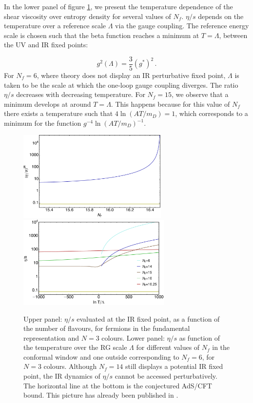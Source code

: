 In the lower panel of figure \ref{etas_Nf}, we present the temperature dependence of the shear viscosity over entropy 
density for several values of $N_f$. $\eta/s$ depends on the temperature over a reference scale $\Lambda$ via the 
gauge coupling. The reference energy scale is chosen such that the beta function reaches a minimum at $T=\Lambda$,
between the UV and IR fixed points:

\begin{equation}
g^2(\Lambda)=\frac{3}{5}(g^*)^2 \, .
\label{Lambda_visc}
\end{equation} 
%
For $N_f = 6$, where theory does not display an IR perturbative fixed point, $\Lambda$ is taken to be the scale at 
which the one-loop gauge coupling diverges. The ratio $\eta/s$ decreases with decreasing temperature. For $N_f=15$, we observe that a minimum develops at around $T = \Lambda$.  This happens  because for this value of $N_f$ there exists a temperature such that $4 \ln \left(AT/m_D \right)  = 1 $, which corresponds to a minimum for the function $g^{-4} \ln \left(AT/m_D \right)  ^{-1} $. 

\begin{figure}[h!]
\begin{center}
\includegraphics[width=0.665\textwidth]{pics/eta-s-n3} \\
\includegraphics[width=0.68\textwidth]{pics/Temperature-etaovers-n3}
\end{center}
\caption{Upper panel: ${\eta}/{s}$ evaluated at the IR fixed point, as a function of the number of flavours, for fermions in 
the fundamental representation and $N = 3$ colours. Lower panel:  ${\eta}/{s}$ as function of the temperature over the 
RG scale $\Lambda$  for different values of $N_f$ in the conformal window and one outside corresponding to $N_f = 6$, for $N=3$ colours. Although $N_f = 14$ still displays a potential IR fixed point, the IR dynamics  of ${\eta}/{s}$ cannot be accessed perturbatively.  
The horizontal line at the bottom is the conjectured AdS/CFT bound. This picture has already been published in \cite{Toniato:2016twr}.} 
\label{etas_Nf}
\end{figure}

